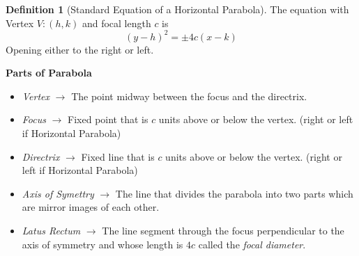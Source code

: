 \documentclass[a4paper]{article}
\theoremstyle{definition}
\newtheorem*{defi}{Definition}
\begin{document}
\begin{defi}[Standard Equation of a Horizontal Parabola]
    The equation with Vertex $V:(h,k)$ and focal length $c$ is
    \begin{equation*}
        (y-h)^2 = \pm4c(x-k)
    \end{equation*}
    Opening either to the right or left.
\end{defi}
\textbf{Parts of Parabola}
\begin{itemize} 
    \item \emph{Vertex} $\rightarrow$ The point midway between the focus and the
    directrix.
    \item \emph{Focus} $\rightarrow$ Fixed point that is $c$ units above or
    below the vertex. (right or left if Horizontal Parabola)
    \item \emph{Directrix} $\rightarrow$ Fixed line that is $c$ units above or
    below the vertex. (right or left if Horizontal Parabola)
    \item \emph{Axis of Symettry}  $\rightarrow$ The line that divides the
    parabola into two parts which are mirror images of each other.
    \item \emph{Latus Rectum}  $\rightarrow$ The line segment through the focus
    perpendicular to the axis of symmetry and whose length is $4c$ called the
    \emph{focal diameter}.
\end{itemize}
\end{document}
